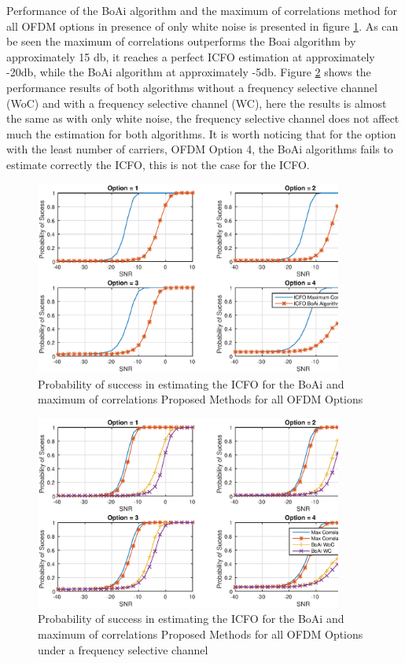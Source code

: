 Performance of the BoAi algorithm and the maximum of correlations method for all OFDM options in presence of only white noise is presented in figure \ref{fig:boai_xcorrmax_results}. As can be seen the maximum of correlations outperforms the Boai algorithm by approximately 15 db, it reaches a perfect ICFO estimation at approximately -20db, while the BoAi algorithm at approximately -5db. Figure \ref{fig:boai_xcorrmax_results_channel_freq} shows the performance results of both algorithms without a frequency selective channel (WoC) and with a frequency selective channel (WC), here the results is almost the same as with only white noise, the frequency selective channel does not affect much the estimation for both algorithms. It is worth noticing that for the option with the least number of carriers, OFDM Option 4, the BoAi algorithms fails to estimate correctly the ICFO, this is not the case for the ICFO.  


\begin{figure}[hbt]
  \centering
    \includegraphics[width=0.9\textwidth]
      {./figures/p_sucess_icfo_all_alg_ch0}
  \caption{Probability of success in estimating the ICFO for the BoAi and maximum of correlations Proposed Methods for all OFDM Options}
  \label{fig:boai_xcorrmax_results}
\end{figure}



\begin{figure}[hbt]
  \centering
    \includegraphics[width=0.9\textwidth]
      {./figures/p_sucess_icfo_ch_all}
  \caption{Probability of success in estimating the ICFO for the BoAi and maximum of correlations Proposed Methods for all OFDM Options under a frequency selective channel}
  \label{fig:boai_xcorrmax_results_channel_freq}
\end{figure}

